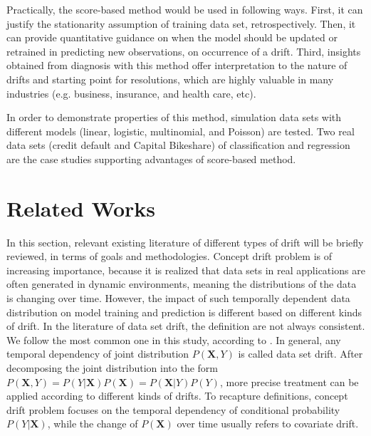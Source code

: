 \documentclass[twoside,11pt]{article}
\begin{document}
Practically, the score-based method would be used in following ways. First, it can justify the stationarity assumption of training data set, retrospectively. Then, it can provide quantitative guidance on when the model should be updated or retrained in predicting new observations, on occurrence of a drift. Third, insights obtained from diagnosis with this method offer interpretation to the nature of drifts and starting point for resolutions, which are highly valuable in many industries (e.g. business, insurance, and health care, etc). 

In order to demonstrate properties of this method, simulation data sets with different models (linear, logistic, multinomial, and Poisson) are tested. Two real data sets (credit default and Capital Bikeshare) of classification and regression are the case studies supporting advantages of score-based method.

\section{Related Works}
In this section, relevant existing literature of different types of drift will be briefly reviewed, in terms of goals and methodologies. Concept drift problem is of increasing importance, because it is realized that data sets in real applications are often generated in dynamic environments, meaning the distributions of the data is changing over time. However, the impact of such temporally dependent data distribution on model training and prediction is different based on different kinds of drift. In the literature  of data set drift, the definition are not always consistent. We follow the most common one in this study, according to \cite{moreno2012unifying,vzliobaite2016overview}. In general, any temporal dependency of joint distribution $P(\bm {X}, Y)$ is called data set drift. After decomposing the joint distribution into the form $P(\bm{X}, Y) = P(Y|\bm{X})P(\bm {X})=P(\bm {X}| {Y})P(Y)$, more precise treatment can be applied according to different kinds of drifts. To recapture definitions, concept drift problem focuses on the temporal dependency of conditional probability $P(Y|\bm{X})$, while the change of $P(\bm{X})$ over time usually refers to covariate drift.
\end{document}
